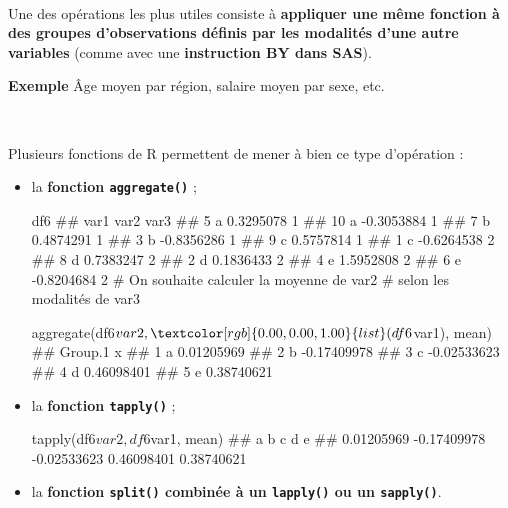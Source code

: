 \documentclass[12pt,twosided, notitlepage]{book}
\newenvironment{Shaded}{}{}
\newcommand{\KeywordTok}[1]{\textcolor[rgb]{0.00,0.00,1.00}{#1}}
\newcommand{\CommentTok}[1]{\textcolor[rgb]{0.00,0.50,0.00}{#1}}
\newcommand{\OperatorTok}[1]{#1}
\newcommand{\NormalTok}[1]{#1}
\renewenvironment{Shaded}{\begin{snugshade}}{\end{snugshade}}
\begin{document}
~

Une des opérations les plus utiles consiste à \textbf{appliquer une même
fonction à des groupes d'observations définis par les modalités d'une
autre variables} (comme avec une \textbf{instruction BY dans SAS}).

\textbf{Exemple} Âge moyen par région, salaire moyen par sexe, etc.

~

Plusieurs fonctions de R permettent de mener à bien ce type d'opération
:

\begin{itemize}
\item
  la \textbf{fonction
  \texttt{aggregate()}} ;

\begin{Shaded}
\begin{Highlighting}[]
\NormalTok{df6}
\NormalTok{  ##    var1       var2 var3}
\NormalTok{  ## 5     a  0.3295078    1}
\NormalTok{  ## 10    a -0.3053884    1}
\NormalTok{  ## 7     b  0.4874291    1}
\NormalTok{  ## 3     b -0.8356286    1}
\NormalTok{  ## 9     c  0.5757814    1}
\NormalTok{  ## 1     c -0.6264538    2}
\NormalTok{  ## 8     d  0.7383247    2}
\NormalTok{  ## 2     d  0.1836433    2}
\NormalTok{  ## 4     e  1.5952808    2}
\NormalTok{  ## 6     e -0.8204684    2}
\CommentTok{# On souhaite calculer la moyenne de var2}
\CommentTok{# selon les modalités de var3}

\KeywordTok{aggregate}\NormalTok{(df6}\OperatorTok{$}\NormalTok{var2, }\KeywordTok{list}\NormalTok{(df6}\OperatorTok{$}\NormalTok{var1), mean)}
\NormalTok{  ##   Group.1           x}
\NormalTok{  ## 1       a  0.01205969}
\NormalTok{  ## 2       b -0.17409978}
\NormalTok{  ## 3       c -0.02533623}
\NormalTok{  ## 4       d  0.46098401}
\NormalTok{  ## 5       e  0.38740621}
\end{Highlighting}
\end{Shaded}
\item
  la \textbf{fonction \texttt{tapply()}} ;

\begin{Shaded}
\begin{Highlighting}[]
\KeywordTok{tapply}\NormalTok{(df6}\OperatorTok{$}\NormalTok{var2, df6}\OperatorTok{$}\NormalTok{var1, mean)}
\NormalTok{  ##           a           b           c           d           e }
\NormalTok{  ##  0.01205969 -0.17409978 -0.02533623  0.46098401  0.38740621}
\end{Highlighting}
\end{Shaded}
\item
  la \textbf{fonction \texttt{split()} combinée à un \texttt{lapply()}
  ou un
  \texttt{sapply()}}.


\end{itemize}
\end{document}
